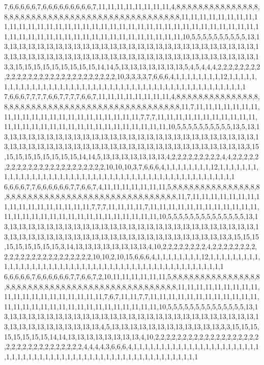 7,6,6,6,6,6,7,6,6,6,6,6,6,6,6,6,7,11,11,11,11,11,11,11,11,4,8,8,8,8,8,8,8,8,8,8,8,8,8,8,8,8,8,8,8,8,8,8,8,8,8,8,8,8,8,8,8,8,8,8,8,8,8,8,8,8,8,8,8,8,8,8,8,11,11,11,11,11,11,11,11,11,11,11,11,11,11,11,11,11,11,11,11,11,11,11,11,11,11,11,11,11,11,11,11,11,11,11,11,11,11,11,11,11,11,11,11,11,11,11,11,11,11,11,11,11,11,11,11,10,5,5,5,5,5,5,5,5,5,5,13,13,13,13,13,13,13,13,13,13,13,13,13,13,13,13,13,13,13,13,13,13,13,13,13,13,13,13,13,13,13,13,13,13,13,13,13,13,13,13,13,13,13,13,13,13,13,13,13,13,13,13,13,13,13,13,13,13,3,15,15,15,15,15,15,15,15,15,14,14,5,13,13,13,13,13,13,13,5,4,5,4,4,4,2,2,2,2,2,2,2,2,2,2,2,2,2,2,2,2,2,2,2,2,2,2,2,2,2,2,2,2,10,3,3,3,3,7,6,6,6,4,1,1,1,1,1,1,1,1,12,1,1,1,1,1,1,1,1,1,1,1,1,1,1,1,1,1,1,1,1,1,1,1,1,1,1,1,1,1,1,1,1,1,1,1,1,1,1,1,1,1,1,1,1,1,1,1,1,1
7,6,6,6,7,7,7,7,6,6,7,7,7,7,6,6,7,11,11,11,11,11,11,11,11,4,8,8,8,8,8,8,8,8,8,8,8,8,8,8,8,8,8,8,8,8,8,8,8,8,8,8,8,8,8,8,8,8,8,8,8,8,8,8,8,8,8,8,8,8,8,8,8,11,7,11,11,11,11,11,11,11,11,11,11,11,11,11,11,11,11,11,11,11,11,11,11,7,7,7,11,11,11,11,11,11,11,11,11,11,11,11,11,11,11,11,11,11,11,11,11,11,11,11,11,11,11,11,11,10,5,5,5,5,5,5,5,5,5,5,13,5,13,13,13,13,13,13,13,13,13,13,13,13,13,13,13,13,13,13,13,13,13,13,13,13,13,13,13,13,13,13,13,13,13,13,13,13,13,13,13,13,13,13,13,13,13,13,13,13,13,13,13,13,13,13,13,13,3,15,15,15,15,15,15,15,15,15,14,14,5,13,13,13,13,13,13,13,4,2,2,2,2,2,2,2,2,2,4,4,2,2,2,2,2,2,2,2,2,2,2,2,2,2,2,2,2,2,2,2,2,2,2,10,10,10,3,7,6,6,6,4,1,1,1,1,1,1,1,1,12,1,1,1,1,1,1,1,1,1,1,1,1,1,1,1,1,1,1,1,1,1,1,1,1,1,1,1,1,1,1,1,1,1,1,1,1,1,1,1,1,1,1,1,1,1,1,1,1,1
6,6,6,6,7,7,6,6,6,6,6,6,7,7,6,6,7,4,11,11,11,11,11,11,11,5,8,8,8,8,8,8,8,8,8,8,8,8,8,8,8,8,8,8,8,8,8,8,8,8,8,8,8,8,8,8,8,8,8,8,8,8,8,8,8,8,8,8,8,8,8,8,8,11,7,11,11,11,11,11,11,11,11,11,11,11,11,11,11,11,11,11,7,7,7,11,11,11,11,7,11,11,11,11,11,11,11,11,11,11,11,11,11,11,11,11,11,11,11,11,11,11,11,11,11,11,11,11,11,10,5,5,5,5,5,5,5,5,5,5,5,5,5,5,13,13,13,13,13,13,13,13,13,13,13,13,13,13,13,13,13,13,13,13,13,13,13,13,13,13,13,13,13,13,13,13,13,13,13,13,13,13,13,13,13,13,13,13,13,13,13,13,13,13,13,13,13,13,3,15,15,15,15,15,15,15,15,15,3,14,13,13,13,13,13,13,13,13,4,10,2,2,2,2,2,2,2,2,4,2,2,2,2,2,2,2,2,2,2,2,2,2,2,2,2,2,2,2,2,2,2,2,2,10,10,2,10,15,6,6,6,4,1,1,1,1,1,1,1,1,12,1,1,1,1,1,1,1,1,1,1,1,1,1,1,1,1,1,1,1,1,1,1,1,1,1,1,1,1,1,1,1,1,1,1,1,1,1,1,1,1,1,1,1,1,1,1,1,1,1
6,6,6,6,6,7,6,6,6,6,6,6,7,7,6,6,7,2,10,11,11,11,11,11,11,5,8,8,8,8,8,8,8,8,8,8,8,8,8,8,8,8,8,8,8,8,8,8,8,8,8,8,8,8,8,8,8,8,8,8,8,8,8,8,8,8,8,8,8,8,8,8,8,11,11,11,11,11,11,11,11,11,11,11,11,11,11,11,11,11,11,11,11,7,6,7,11,11,7,7,11,11,11,11,11,11,11,11,11,11,11,11,11,11,11,11,11,11,11,11,11,11,11,11,11,11,11,11,11,10,5,5,5,5,5,5,5,5,5,5,5,5,5,5,13,13,13,13,13,13,13,13,13,13,13,13,13,13,13,13,13,13,13,13,13,13,13,13,13,13,13,13,13,13,13,13,13,13,13,13,13,13,13,13,4,5,13,13,13,13,13,13,13,13,13,13,13,13,3,3,15,15,15,15,15,15,15,15,14,14,13,13,13,13,13,13,13,13,4,10,2,2,2,2,2,2,2,2,2,2,2,2,2,2,2,2,2,2,2,2,2,2,2,2,2,2,2,2,2,2,2,2,2,4,4,4,4,3,6,6,6,4,1,1,1,1,1,1,1,1,1,1,1,1,1,1,1,1,1,1,1,1,1,1,1,1,1,1,1,1,1,1,1,1,1,1,1,1,1,1,1,1,1,1,1,1,1,1,1,1,1,1,1,1,1,1,1,1,1,1

